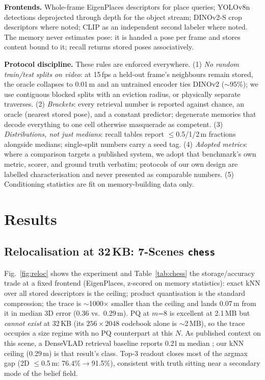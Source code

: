 \documentclass[conference]{IEEEtran}
\begin{document}
\textbf{Frontends.} Whole-frame EigenPlaces descriptors
\cite{berton2023eigenplaces} for place queries; YOLOv8n
\cite{jocher2023yolov8} detections deprojected through depth for the
object stream; DINOv2-S \cite{oquab2023dinov2} crop descriptors where
noted; CLIP \cite{radford2021clip} as an independent second labeler where
noted. The memory never estimates pose: it is handed a pose per frame and
stores content bound to it; recall returns stored poses associatively.

\textbf{Protocol discipline.} These rules are enforced everywhere.
(1) \emph{No random train/test splits on video}: at 15\,fps a held-out
frame's neighbours remain stored, the oracle collapses to 0.01\,m and an
untrained encoder ties DINOv2 ($\sim$95\%); we use contiguous blocked
splits with an eviction radius, or physically separate traverses.
(2) \emph{Brackets}: every retrieval number is reported against chance,
an oracle (nearest stored pose), and a constant predictor; degenerate
memories that decode everything to one cell otherwise masquerade as
competent. (3) \emph{Distributions, not just medians}: recall tables
report $\le$0.5/1/2\,m fractions alongside medians; single-split numbers
carry a seed tag. (4) \emph{Adopted metrics}: where a comparison targets
a published system, we adopt that benchmark's own metric, scorer, and
ground truth verbatim; protocols of our own design are labelled
characterisation and never presented as comparable numbers.
(5) Conditioning statistics are fit on memory-building data only.

\section{Results}
\label{sec:results}

\subsection{Relocalisation at 32\,KB: 7-Scenes \texttt{chess}}
\label{sec:chess}

Fig.~\ref{fig:reloc} shows the experiment and
Table~\ref{tab:chess} the storage/accuracy trade at a fixed frontend
(EigenPlaces, z-scored on memory statistics): exact kNN over all stored
descriptors is the ceiling; product quantisation \cite{jegou2011product}
is the standard compression; the trace is $\sim$1000$\times$ smaller than
the ceiling and lands 0.07\,m from it in median 3D error (0.36 vs.\
0.29\,m). PQ at $m$=8 is excellent at
2.1\,MB but \emph{cannot exist} at 32\,KB (its $256\times2048$
codebook alone is $\sim$2\,MB), so the trace occupies a size regime
with no PQ counterpart at this $N$. As published context on this scene,
a DenseVLAD retrieval baseline reports 0.21\,m median
\cite{sattler2019understanding}; our kNN ceiling (0.29\,m) is that
result's class. Top-3 readout closes most of the argmax gap
(2D $\le$0.5\,m: 76.4\%$\to$91.5\%), consistent with truth sitting near a
secondary mode of the belief field.
\end{document}
